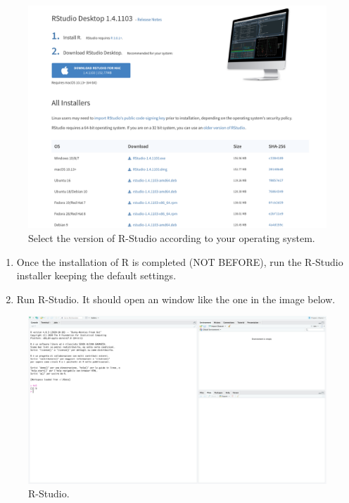 \documentclass[
]{svmono}
\begin{document}
\begin{figure}[H]

{\centering \includegraphics[width=0.8\linewidth,]{images/rstudio} 

}

\caption{Select the version of R-Studio according to your operating system.}\label{fig:unnamed-chunk-3}
\end{figure}

\begin{enumerate}
\def\labelenumi{\arabic{enumi}.}
\setcounter{enumi}{3}
\item
  Once the installation of R is completed (NOT BEFORE), run the R-Studio installer keeping the default settings.
\item
  Run R-Studio. It should open an window like the one in the image below.\\
\end{enumerate}

\begin{figure}[H]

{\centering \includegraphics[width=0.8\linewidth,]{images/rstudio2} 

}

\caption{R-Studio.}\label{fig:unnamed-chunk-4}
\end{figure}
\end{document}
